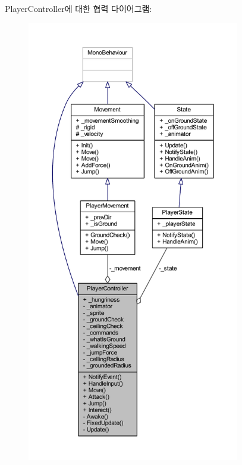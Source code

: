 Player\+Controller에 대한 협력 다이어그램\+:\nopagebreak
\begin{figure}[H]
\begin{center}
\leavevmode
\includegraphics[height=550pt]{db/de2/class_player_controller__coll__graph}
\end{center}
\end{figure}
